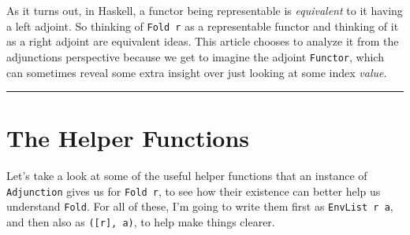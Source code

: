 \documentclass[]{article}
\begin{document}
As it turns out, in Haskell, a functor being representable is \emph{equivalent}
to it having a left adjoint. So thinking of \texttt{Fold\ r} as a representable
functor and thinking of it as a right adjoint are equivalent ideas. This article
chooses to analyze it from the adjunctions perspective because we get to imagine
the adjoint \texttt{Functor}, which can sometimes reveal some extra insight over
just looking at some index \emph{value}.

\begin{center}\rule{0.5\linewidth}{0.5pt}\end{center}

\section{The Helper Functions}\label{the-helper-functions}

Let's take a look at some of the useful helper functions that an instance of
\texttt{Adjunction} gives us for \texttt{Fold\ r}, to see how their existence
can better help us understand \texttt{Fold}. For all of these, I'm going to
write them first as \texttt{EnvList\ r\ a}, and then also as
\texttt{({[}r{]},\ a)}, to help make things clearer.
\end{document}

